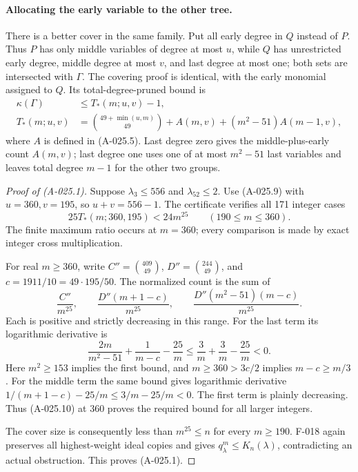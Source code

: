\paragraph{Allocating the early variable to the other tree.}
There is a better cover in the same family. Put all early
degree in $Q$ instead of $P$. Thus $P$ has only middle
variables of degree at most $u$, while $Q$ has unrestricted
early degree, middle degree at most $v$, and last degree
at most one; both sets are intersected with $\Gamma$.
The covering proof is identical, with the early monomial
assigned to $Q$. Its total-degree-pruned bound is
\[
 \begin{split}
 \kappa(\Gamma)&\leq T_*(m;u,v)-1,\\
 T_*(m;u,v)&=\binom{49+\min(u,m)}{49}
                 +A(m,v)+(m^2-51)A(m-1,v),
 \end{split}                                            \tag{A-025.9}
\]
where $A$ is defined in (A-025.5). Last degree zero gives
the middle-plus-early count $A(m,v)$; last degree one
uses one of at most $m^2-51$ last variables and leaves
total degree $m-1$ for the other two groups.

\begin{proof}[Proof of (A-025.1)]
Suppose $\lambda_3\leq556$ and $\lambda_{52}\leq2$.
Use (A-025.9) with $u=360,v=195$, so $u+v=556-1$.
The certificate verifies all 171 integer cases
\[
             25T_*(m;360,195)<24m^{25}
                              \qquad(190\leq m\leq360).        \tag{A-025.10}
\]
The finite maximum ratio occurs at $m=360$; every
comparison is made by exact integer cross multiplication.

For real $m\geq360$, write $C''=\binom{409}{49}$,
$D''=\binom{244}{49}$, and $c=1911/10=49\cdot195/50$.
The normalized count is the sum of
\[
 \frac{C''}{m^{25}},\qquad
 \frac{D''(m+1-c)}{m^{25}},\qquad
 \frac{D''(m^2-51)(m-c)}{m^{25}}.                       \tag{A-025.11}
\]
Each is positive and strictly decreasing in this range.
For the last term its logarithmic derivative is
\[
 \frac{2m}{m^2-51}+\frac1{m-c}-\frac{25}{m}
       \leq\frac3m+\frac3m-\frac{25}{m}<0.
\]
Here $m^2\geq153$ implies the first bound, and
$m\geq360>3c/2$ implies $m-c\geq m/3$.
For the middle term the same bound gives logarithmic
derivative $1/(m+1-c)-25/m\leq3/m-25/m<0$.
The first term is plainly decreasing. Thus (A-025.10)
at $360$ proves the required bound for all larger integers.

The cover size is consequently less than $m^{25}\leq n$
for every $m\geq190$. F-018 again preserves all highest-weight
ideal copies and gives $q^m_\lambda\leq K_n(\lambda)$,
contradicting an actual obstruction. This proves (A-025.1).
\end{proof}

